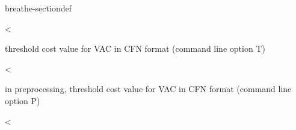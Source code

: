 \documentclass[letterpaper,10pt,openany,oneside,english]{sphinxmanual}
\begin{document}
\begin{fulllineitems}
\begin{sphinxuseclass}{breathe-sectiondef}
\begin{fulllineitems}
\label{\detokenize{ref/ref_cpp:_CPPv4N8ToulBar217costThresholdPreSE}}\label{\detokenize{ref/ref_cpp:_CPPv3N8ToulBar217costThresholdPreSE}}\label{\detokenize{ref/ref_cpp:_CPPv2N8ToulBar217costThresholdPreSE}}\label{\detokenize{ref/ref_cpp:ToulBar2::costThresholdPreS__string}}
\pysigstartsignatures
\pysigstartmultiline
{}
\pysigstopmultiline
\pysigstopsignatures
\sphinxAtStartPar
\textless{} 

\sphinxAtStartPar
threshold cost value for VAC in CFN format (command line option \sphinxhyphen{}T) 

\end{fulllineitems}


\begin{fulllineitems}
\label{\detokenize{ref/ref_cpp:_CPPv4N8ToulBar213costThresholdE}}\label{\detokenize{ref/ref_cpp:_CPPv3N8ToulBar213costThresholdE}}\label{\detokenize{ref/ref_cpp:_CPPv2N8ToulBar213costThresholdE}}\label{\detokenize{ref/ref_cpp:ToulBar2::costThreshold__Cost}}
\pysigstartsignatures
\pysigstartmultiline
{}
\pysigstopmultiline
\pysigstopsignatures
\sphinxAtStartPar
\textless{} 

\sphinxAtStartPar
in preprocessing, threshold cost value for VAC in CFN format (command line option \sphinxhyphen{}P) 

\end{fulllineitems}


\begin{fulllineitems}
\label{\detokenize{ref/ref_cpp:_CPPv4N8ToulBar216costThresholdPreE}}\label{\detokenize{ref/ref_cpp:_CPPv3N8ToulBar216costThresholdPreE}}\label{\detokenize{ref/ref_cpp:_CPPv2N8ToulBar216costThresholdPreE}}\label{\detokenize{ref/ref_cpp:ToulBar2::costThresholdPre__Cost}}
\pysigstartsignatures
\pysigstartmultiline
{}
\pysigstopmultiline
\pysigstopsignatures
\sphinxAtStartPar
\textless{} 


\end{fulllineitems}
\end{sphinxuseclass}
\end{fulllineitems}
\end{document}
